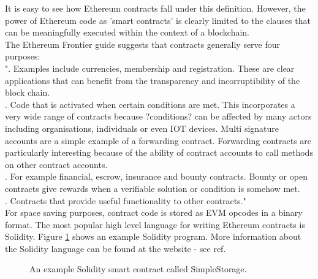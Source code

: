 It is easy to see how Ethereum contracts fall under this definition. However, the power of Ethereum code as 'smart contracts' is clearly limited to the clauses that can be meaningfully executed within the context of a blockchain.\\

The Ethereum Frontier guide\cite{Contracts_guide} suggests that contracts generally serve four purposes: \\

". Examples include currencies, membership and registration. These are clear applications that can benefit from the transparency and incorruptibility of the block chain.\\


. Code that is activated when certain conditions are met. This incorporates a very wide range of contracts because ?conditions? can be affected by many actors including organisations, individuals or even IOT devices. Multi signature accounts are a simple example of a forwarding contract. Forwarding contracts are particularly interesting because of the ability of contract accounts to call methods on other contract accounts.\\


. For example financial, escrow, insurance and bounty contracts. Bounty or open contracts give rewards when a verifiable solution or condition is somehow met. \\


. Contracts that provide useful functionality to other contracts."\\


For space saving purposes, contract code is stored as EVM opcodes in a binary format. The most popular high level language for writing Ethereum contracts is Solidity\cite{Solidity}. Figure \ref{fig:Simplestorage} shows an example Solidity program. More information about the Solidity language can be found at the website - see ref.\\

\begin{figure}
\centering
{}
\decoRule
\caption[SimpleStorage Smart Contract]{An example Solidity smart contract called SimpleStorage.}
\label{fig:Simplestorage}
\end{figure}


